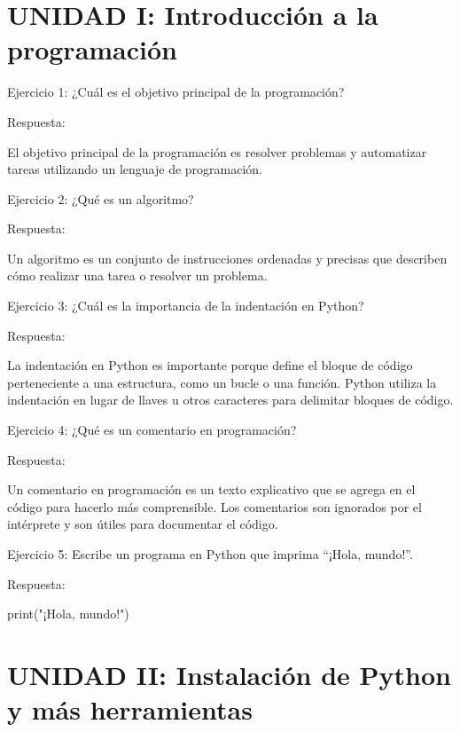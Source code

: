 \documentclass[
  a4paper,
  onepage,
  openany]{scrreprt}
\newenvironment{Shaded}{\begin{snugshade}}{\end{snugshade}}
\newcommand{\BuiltInTok}[1]{\textcolor[rgb]{0.00,0.23,0.31}{#1}}
\newcommand{\NormalTok}[1]{\textcolor[rgb]{0.00,0.23,0.31}{#1}}
\newcommand{\StringTok}[1]{\textcolor[rgb]{0.13,0.47,0.30}{#1}}
\begin{document}
\hypertarget{unidad-i-introducciuxf3n-a-la-programaciuxf3n-1}{%
\section{UNIDAD I: Introducción a la
programación}\label{unidad-i-introducciuxf3n-a-la-programaciuxf3n-1}}

Ejercicio 1: ¿Cuál es el objetivo principal de la programación?

Respuesta:

El objetivo principal de la programación es resolver problemas y
automatizar tareas utilizando un lenguaje de programación.

Ejercicio 2: ¿Qué es un algoritmo?

Respuesta:

Un algoritmo es un conjunto de instrucciones ordenadas y precisas que
describen cómo realizar una tarea o resolver un problema.

Ejercicio 3: ¿Cuál es la importancia de la indentación en Python?

Respuesta:

La indentación en Python es importante porque define el bloque de código
perteneciente a una estructura, como un bucle o una función. Python
utiliza la indentación en lugar de llaves u otros caracteres para
delimitar bloques de código.

Ejercicio 4: ¿Qué es un comentario en programación?

Respuesta:

Un comentario en programación es un texto explicativo que se agrega en
el código para hacerlo más comprensible. Los comentarios son ignorados
por el intérprete y son útiles para documentar el código.

Ejercicio 5: Escribe un programa en Python que imprima ``¡Hola,
mundo!''.

Respuesta:

\begin{Shaded}
\begin{Highlighting}[]
\BuiltInTok{print}\NormalTok{(}\StringTok{"¡Hola, mundo!"}\NormalTok{)}
\end{Highlighting}
\end{Shaded}

\hypertarget{unidad-ii-instalaciuxf3n-de-python-y-muxe1s-herramientas-1}{%
\section{UNIDAD II: Instalación de Python y más
herramientas}\label{unidad-ii-instalaciuxf3n-de-python-y-muxe1s-herramientas-1}}
\end{document}
